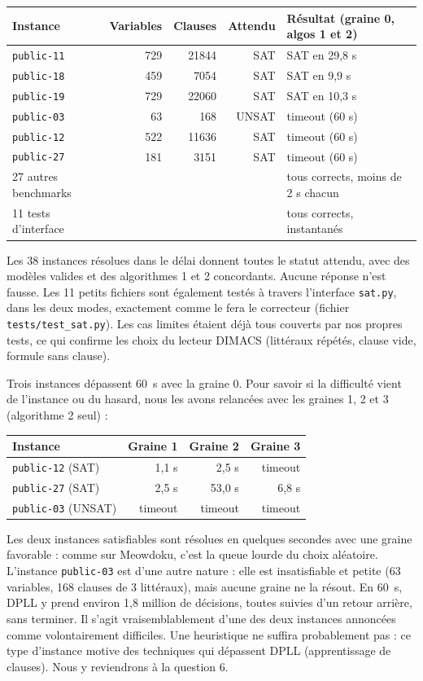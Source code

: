 \documentclass[11pt,a4paper]{article}
\begin{document}
\begin{center}
\begin{tabular}{lrrrl}
  Instance & Variables & Clauses & Attendu & Résultat (graine 0, algos 1 et 2) \\
  \hline
  \texttt{public-11} & 729 & 21844 & SAT   & SAT en 29,8 s \\
  \texttt{public-18} & 459 & 7054  & SAT   & SAT en 9,9 s \\
  \texttt{public-19} & 729 & 22060 & SAT   & SAT en 10,3 s \\
  \texttt{public-03} & 63  & 168   & UNSAT & timeout (60 s) \\
  \texttt{public-12} & 522 & 11636 & SAT   & timeout (60 s) \\
  \texttt{public-27} & 181 & 3151  & SAT   & timeout (60 s) \\
  27 autres benchmarks & & & & tous corrects, moins de 2 s chacun \\
  11 tests d'interface & & & & tous corrects, instantanés \\
\end{tabular}
\end{center}

Les 38 instances résolues dans le délai donnent toutes le statut attendu,
avec des modèles valides et des algorithmes 1 et 2 concordants. Aucune
réponse n'est fausse. Les 11 petits fichiers sont également testés à travers
l'interface \texttt{sat.py}, dans les deux modes, exactement comme le fera
le correcteur (fichier \texttt{tests/test\_sat.py}). Les cas limites étaient
déjà tous couverts par nos propres tests, ce qui confirme les choix du
lecteur DIMACS (littéraux répétés, clause vide, formule sans clause).

Trois instances dépassent 60~s avec la graine 0. Pour savoir si la
difficulté vient de l'instance ou du hasard, nous les avons relancées avec
les graines 1, 2 et 3 (algorithme 2 seul) :
\begin{center}
\begin{tabular}{lrrr}
  Instance & Graine 1 & Graine 2 & Graine 3 \\
  \hline
  \texttt{public-12} (SAT)   & 1,1 s    & 2,5 s    & timeout \\
  \texttt{public-27} (SAT)   & 2,5 s    & 53,0 s   & 6,8 s \\
  \texttt{public-03} (UNSAT) & timeout  & timeout  & timeout \\
\end{tabular}
\end{center}
Les deux instances satisfiables sont résolues en quelques secondes avec
une graine favorable : comme sur Meowdoku, c'est la queue lourde du choix
aléatoire. L'instance \texttt{public-03} est d'une autre nature : elle est
insatisfiable et petite (63 variables, 168 clauses de 3 littéraux), mais
aucune graine ne la résout. En 60~s, DPLL y prend environ 1,8 million de
décisions, toutes suivies d'un retour arrière, sans terminer. Il s'agit
vraisemblablement d'une des deux instances annoncées comme volontairement
difficiles. Une heuristique ne suffira probablement pas : ce type
d'instance motive des techniques qui dépassent DPLL (apprentissage de
clauses). Nous y reviendrons à la question 6.
\end{document}
